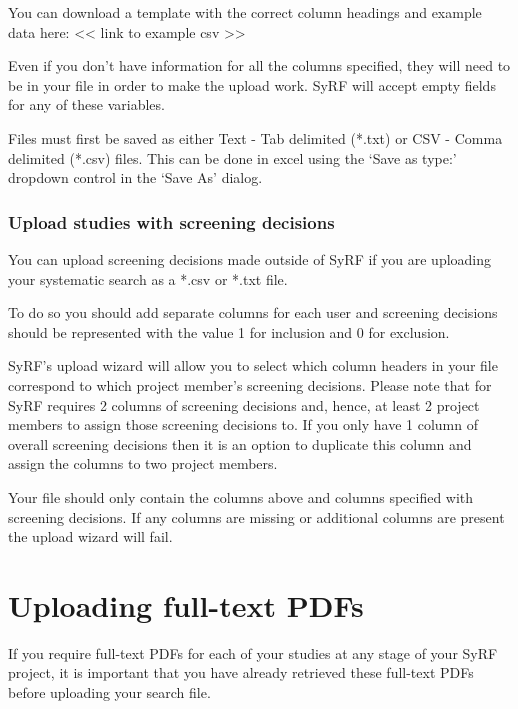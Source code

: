 \documentclass[
]{book}
\begin{document}
You can download a template with the correct column headings and example data here:
\textless{}\textless{} link to example csv \textgreater{}\textgreater{}

Even if you don't have information for all the columns specified, they will need to be in your file in order to make the upload work. SyRF will accept empty fields for any of these
variables.

Files must first be saved as either Text - Tab delimited (*.txt) or CSV - Comma delimited (*.csv) files. This can be done in excel using the `Save as type:' dropdown control in the `Save As' dialog.

\hypertarget{upload-studies-with-screening-decisions}{%
\subsubsection{Upload studies with screening decisions}\label{upload-studies-with-screening-decisions}}

You can upload screening decisions made outside of SyRF if you are uploading your systematic search as a *.csv or *.txt file.

To do so you should add separate columns for each user and screening decisions should be represented with the value 1 for inclusion and 0 for exclusion.

SyRF's upload wizard will allow you to select which column headers in your file correspond to which project member's screening decisions. Please note that for SyRF requires 2 columns of screening decisions and, hence, at least 2 project members to assign those screening decisions to. If you only have 1 column of overall screening decisions then it is an option to duplicate this column and assign the columns to two project members.

Your file should only contain the columns above and columns specified with screening decisions. If any columns are missing or additional columns are present the upload wizard will fail.

\hypertarget{uploading-full-text-pdfs}{%
\section{Uploading full-text PDFs}\label{uploading-full-text-pdfs}}

If you require full-text PDFs for each of your studies at any stage of your SyRF project, it is important that you have already retrieved these full-text PDFs before uploading your search file.
\end{document}
